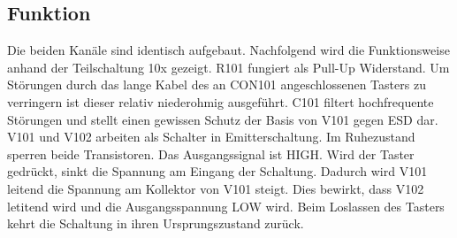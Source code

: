 \subsection{Funktion}
Die beiden Kanäle sind identisch aufgebaut. Nachfolgend wird die Funktionsweise anhand der Teilschaltung 10x gezeigt. R101 fungiert als Pull-Up Widerstand. Um Störungen durch das lange Kabel des an CON101 angeschlossenen Tasters zu verringern ist dieser relativ niederohmig ausgeführt. C101 filtert hochfrequente Störungen und stellt einen gewissen Schutz der Basis von V101 gegen ESD dar. V101 und V102 arbeiten als Schalter in Emitterschaltung. Im Ruhezustand sperren beide Transistoren. Das Ausgangssignal ist HIGH. Wird der Taster gedrückt, sinkt die Spannung am Eingang der Schaltung. Dadurch wird V101 leitend die Spannung am Kollektor von V101 steigt. Dies bewirkt, dass V102 letitend wird und die Ausgangsspannung LOW wird. Beim Loslassen des Tasters kehrt die Schaltung in ihren Ursprungszustand zurück. 

